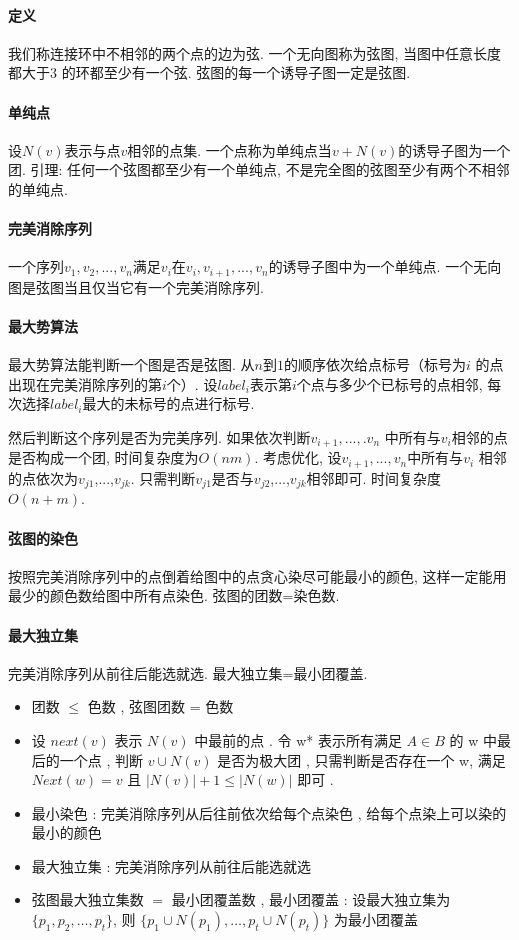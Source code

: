 \paragraph{定义}我们称连接环中不相邻的两个点的边为弦. 一个无向图称为弦图, 当图中任意长度都大于$3$ 的环都至少有一个弦. 弦图的每一个诱导子图一定是弦图. 
\paragraph{单纯点}设$N(v)$表示与点$v$相邻的点集. 一个点称为单纯点当${v}+N(v)$的诱导子图为一个团. 引理: 任何一个弦图都至少有一个单纯点, 不是完全图的弦图至少有两个不相邻的单纯点. 
\paragraph{完美消除序列}一个序列${v_1,v_2,...,v_n}$满足$v_i$在${v_i,v_{i+1},...,v_n}$的诱导子图中为一个单纯点. 一个无向图是弦图当且仅当它有一个完美消除序列. 
\paragraph{最大势算法}最大势算法能判断一个图是否是弦图. 从$n$到$1$的顺序依次给点标号（标号为$i$ 的点出现在完美消除序列的第$i$个）. 设$label_i$表示第$i$个点与多少个已标号的点相邻, 每次选择$label_i$最大的未标号的点进行标号. 
\par 然后判断这个序列是否为完美序列. 如果依次判断${v_{i+1},...,.v_n}$ 中所有与$v_i$相邻的点是否构成一个团, 时间复杂度为$O(nm)$. 考虑优化, 设${v_{i+1},...,v_n}$中所有与$v_i$ 相邻的点依次为$v_{j1}$,...,$v_{jk}$.  只需判断$v_{j1}$是否与$v_{j2}$,...,$v_{jk}$相邻即可. 时间复杂度$O(n+m)$. 
\paragraph{弦图的染色}按照完美消除序列中的点倒着给图中的点贪心染尽可能最小的颜色, 这样一定能用最少的颜色数给图中所有点染色. 弦图的团数=染色数. 
\paragraph{最大独立集}完美消除序列从前往后能选就选. 最大独立集=最小团覆盖. 

\begin{itemize}
\item 团数 $\leq$ 色数 , 弦图团数 = 色数

\item 设 $next(v)$ 表示 $N(v)$ 中最前的点 . 
令 w* 表示所有满足 $A \in B$ 的 w 中最后的一个点 , 
判断 $v \cup N(v)$ 是否为极大团 , 
只需判断是否存在一个 w, 
满足 $Next(w)=v$ 且 $|N(v)| + 1 \leq |N(w)|$ 即可 . 

\item 最小染色 : 完美消除序列从后往前依次给每个点染色 , 
给每个点染上可以染的最小的颜色

\item 最大独立集 : 完美消除序列从前往后能选就选

\item 弦图最大独立集数 $=$ 最小团覆盖数 , 
最小团覆盖 : 
设最大独立集为 $\{p_1,p_2, \dots ,p_t\}$, 
则 $\{p_1\cup N(p_1), \dots , p_t \cup N(p_t)\}$ 
为最小团覆盖
\end{itemize}
